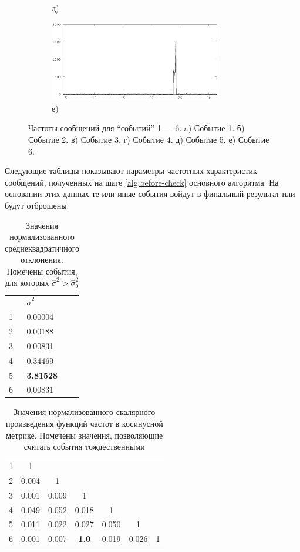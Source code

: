 \documentclass[12pt, a4paper]{article}
\newcommand\todo[1]{\marginpar{\textcolor{red}{#1}}}
\begin{document}
\begin{figure}[H]
\begin{subfigure}[b]{0.45 \textwidth}
		\caption*{д)}
	\end{subfigure}  
	\begin{subfigure}[b]{0.45 \textwidth}
		\centering
		\includegraphics[width=7.5cm]{all-freq-23-20.eps}	
		\caption*{е)}
	\end{subfigure}  
	
	\caption{Частоты сообщений для ``событий'' 1 --- 6. a) Событие 1. б) Событие 2. в) Событие 3. г) Событие 4. д) Событие 5. е) Событие 6.}
	\end{figure}	  
	  
	Следующие таблицы показывают параметры частотных характеристик сообщений, полученных на шаге \ref{alg:before-check} основного алгоритма. На основании этих данных те или иные события войдут в финальный результат или будут отброшены.
	
	\begin{table}[H]
	\centering
	\caption{Значения нормализованного среднеквадратичного отклонения. Помечены события, для которых  $\hat{\sigma}^2>\hat{\sigma}_0^2$}
	\begin{tabular}{l | l}
	& $\hat{\sigma}^2$ \\ 
	1 & 0.00004 \\ 
	2 & 0.00188 \\ 
	3 & 0.00831 \\ 
	4 & 0.34469 \\ 
	5 & \textbf{3.81528} \\ 
	6 & 0.00831 \\ 
	\end{tabular}
	
	\label{sd-table}
	\end{table}
	
	
	\begin{table}[H]
	\centering
	\caption{Значения нормализованного скалярного произведения функций частот в косинусной метрике. Помечены значения, позволяющие считать события тождественными}
	\begin{tabular}{ r | c  c  c  c  c  c }
		1 & 1 & & & & & \\
		2 & 0.004 & 1 & & & & \\ 
		3 & 0.001 & 0.009 & 1 & & & \\ 
		4 & 0.049 & 0.052 & 0.018 & 1 & & \\
		5 & 0.011 & 0.022 & 0.027 & 0.050 & 1 & \\
		6 & 0.001 & 0.007 & \textbf{1.0} & 0.019 & 0.026 & 1 \\
	\end{tabular}
	
	\label{dotprod-table}
	\end{table}
	
\end{document}
